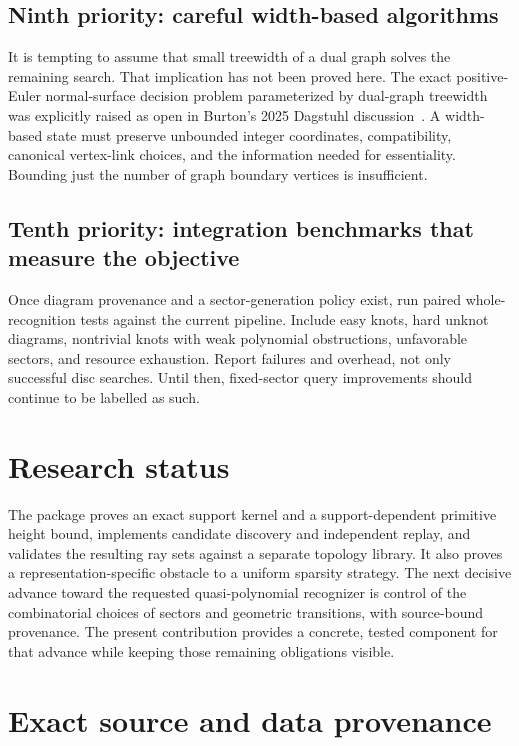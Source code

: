 \documentclass[11pt]{article}
\theoremstyle{definition}
\theoremstyle{remark}
\begin{document}
\subsection{Ninth priority: careful width-based algorithms}

It is tempting to assume that small treewidth of a dual graph solves the
remaining search. That implication has not been proved here. The exact
positive-Euler normal-surface decision problem parameterized by dual-graph
treewidth was explicitly raised as open in Burton's 2025 Dagstuhl
discussion~\cite{dagstuhl}. A width-based state must preserve unbounded
integer coordinates, compatibility, canonical vertex-link choices, and the
information needed for essentiality. Bounding just the number of graph
boundary vertices is insufficient.

\subsection{Tenth priority: integration benchmarks that measure the objective}

Once diagram provenance and a sector-generation policy exist, run paired
whole-recognition tests against the current pipeline. Include easy knots,
hard unknot diagrams, nontrivial knots with weak polynomial obstructions,
unfavorable sectors, and resource exhaustion. Report failures and overhead,
not only successful disc searches. Until then, fixed-sector query improvements
should continue to be labelled as such.

\section{Research status}

The package proves an exact support kernel and a support-dependent primitive
height bound, implements candidate discovery and independent replay, and
validates the resulting ray sets against a separate topology library. It also
proves a representation-specific obstacle to a uniform sparsity strategy.
The next decisive advance toward the requested quasi-polynomial recognizer
is control of the combinatorial choices of sectors and geometric transitions,
with source-bound provenance. The present contribution provides a concrete,
tested component for that advance while keeping those remaining obligations
visible.

\appendix
\section{Exact source and data provenance}
\end{document}
